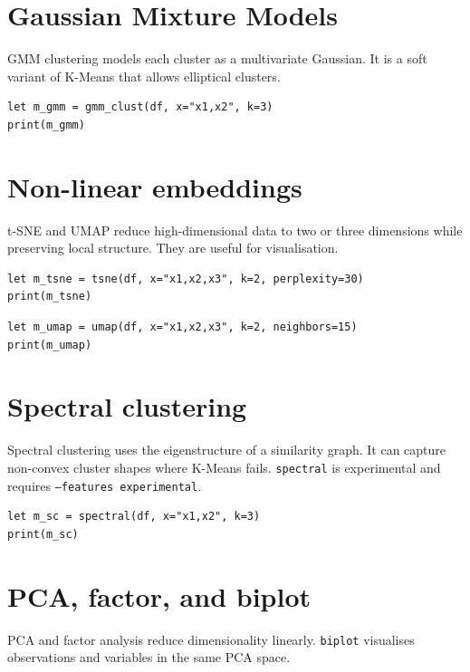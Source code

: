 \section{Gaussian Mixture Models}

GMM clustering models each cluster as a multivariate Gaussian. It is a
soft variant of K-Means that allows elliptical clusters.

\begin{lstlisting}[caption={GMM clustering}]
let m_gmm = gmm_clust(df, x="x1,x2", k=3)
print(m_gmm)
\end{lstlisting}

\section{Non-linear embeddings}

t-SNE and UMAP reduce high-dimensional data to two or three dimensions
while preserving local structure. They are useful for visualisation.

\begin{lstlisting}[caption={t-SNE}]
let m_tsne = tsne(df, x="x1,x2,x3", k=2, perplexity=30)
print(m_tsne)
\end{lstlisting}

\begin{lstlisting}[caption={UMAP}]
let m_umap = umap(df, x="x1,x2,x3", k=2, neighbors=15)
print(m_umap)
\end{lstlisting}

\section{Spectral clustering}

Spectral clustering uses the eigenstructure of a similarity graph. It
can capture non-convex cluster shapes where K-Means fails.
\texttt{spectral} is experimental and requires \texttt{--features experimental}.

\begin{lstlisting}[caption={Spectral clustering}]
let m_sc = spectral(df, x="x1,x2", k=3)
print(m_sc)
\end{lstlisting}

\section{PCA, factor, and biplot}

PCA and factor analysis reduce dimensionality linearly. \texttt{biplot}
visualises observations and variables in the same PCA space.

